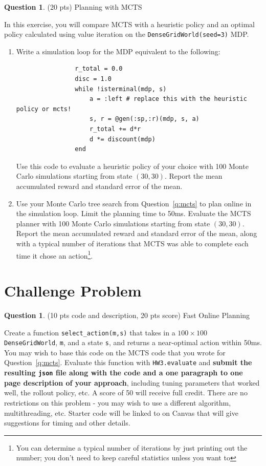 \documentclass{article}
\theoremstyle{definition}
\newtheorem{question}[thm]{Question}
\begin{document}
\begin{question}
    (20 pts) Planning with MCTS

    In this exercise, you will compare MCTS with a heuristic policy and an optimal policy calculated using value iteration on the \texttt{DenseGridWorld(seed=3)} MDP.

    \begin{enumerate}[label=\alph*)]
        \item Write a simulation loop for the MDP equivalent to the following:
            \begin{verbatim}
                r_total = 0.0
                disc = 1.0
                while !isterminal(mdp, s)
                    a = :left # replace this with the heuristic policy or mcts!
                    s, r = @gen(:sp,:r)(mdp, s, a)
                    r_total += d*r
                    d *= discount(mdp)
                end
            \end{verbatim} Use this code to evaluate a heuristic policy of your choice with 100 Monte Carlo simulations starting from state $(30, 30)$. Report the mean accumulated reward and standard error of the mean.
        \item Use your Monte Carlo tree search from Question~\ref{q:mcts} to plan online in the simulation loop. Limit the planning time to 50ms. Evaluate the MCTS planner with 100 Monte Carlo simulations starting from state $(30, 30)$. Report the mean accumulated reward and standard error of the mean, along with a typical number of iterations that MCTS was able to complete each time it chose an action\footnote{You can determine a typical number of iterations by just printing out the number; you don't need to keep careful statistics unless you want to}.
    \end{enumerate}


\end{question}

\section{Challenge Problem}

\begin{question}
    (10 pts code and description, 20 pts score) Fast Online Planning
    
    Create a function \texttt{select\_action(m,s)} that takes in a $100 \times 100$ \texttt{DenseGridWorld}, \texttt{m}, and a state \texttt{s}, and returns a near-optimal action within 50ms. You may wish to base this code on the MCTS code that you wrote for Question~\ref{q:mcts}. Evaluate this function with \texttt{HW3.evaluate} and \textbf{submit the resulting \texttt{json} file along with the code and a one paragraph to one page description of your approach}, including tuning parameters that worked well, the rollout policy, etc. A score of 50 will receive full credit. There are no restrictions on this problem - you may wish to use a different algorithm, multithreading, etc. Starter code will be linked to on Canvas that will give suggestions for timing and other details.
\end{question}
\end{document}
